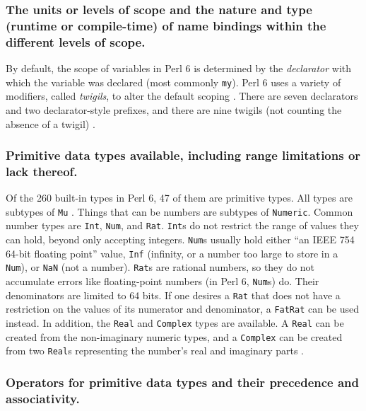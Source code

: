 \documentclass[14pt,english]{extarticle}
\begin{document}
\subsubsection*{The units or levels of scope and the nature and type (runtime or
compile-time) of name bindings within the different levels of scope.}

By default, the scope of variables in Perl 6 is determined by the
\emph{declarator} with which the variable was declared (most commonly
\texttt{my}). Perl 6 uses a variety of modifiers, called \emph{twigils},
to alter the default scoping \cite{Documentation}. There are seven
declarators and two declarator-style prefixes, and there are nine
twigils (not counting the absence of a twigil) \cite{Documentation}. 


\subsubsection*{Primitive data types available, including range limitations or lack
thereof.}

Of the 260 built-in types in Perl 6, 47 of them are primitive types.
All types are subtypes of \texttt{Mu} \cite{Documentation}. Things
that can be numbers are subtypes of \texttt{Numeric}. Common number
types are \texttt{Int}, \texttt{Num}, and \texttt{Rat}. \texttt{Int}s
do not restrict the range of values they can hold, beyond only accepting
integers. \texttt{Num}s usually hold either ``an IEEE 754 64-bit
floating point'' \cite{Documentation} value, \texttt{Inf} (infinity,
or a number too large to store in a \texttt{Num}), or \texttt{NaN}
(not a number). \texttt{Rat}s are rational numbers, so they do not
accumulate errors like floating-point numbers (in Perl 6, \texttt{Num}s)
do. Their denominators are limited to 64 bits. If one desires a \texttt{Rat}
that does not have a restriction on the values of its numerator and
denominator, a \texttt{FatRat} can be used instead. In addition, the
\texttt{Real} and \texttt{Complex} types are available. A \texttt{Real}
can be created from the non-imaginary numeric types, and a \texttt{Complex}
can be created from two \texttt{Real}s representing the number's real
and imaginary parts \cite{Documentation}. 


\subsubsection*{Operators for primitive data types and their precedence and associativity.}
\end{document}
